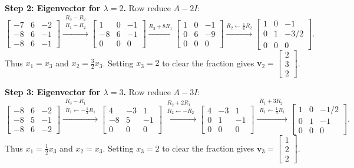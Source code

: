 \documentclass[11pt, letterpaper]{article}
\theoremstyle{definition}
\theoremstyle{remark}
\begin{document}
\textbf{Step 2: Eigenvector for $\lambda = 2$.} Row reduce $A - 2I$:
\[
\begin{bmatrix} -7 & 6 & -2 \\ -8 & 6 & -1 \\ -8 & 6 & -1 \end{bmatrix}
\xrightarrow{\substack{R_{3} - R_{2} \\ R_{1} - R_{2}}}
\begin{bmatrix} 1 & 0 & -1 \\ -8 & 6 & -1 \\ 0 & 0 & 0 \end{bmatrix}
\xrightarrow{R_{2} + 8R_{1}}
\begin{bmatrix} 1 & 0 & -1 \\ 0 & 6 & -9 \\ 0 & 0 & 0 \end{bmatrix}
\xrightarrow{R_{2} \leftarrow \frac{1}{6}R_{2}}
\begin{bmatrix} 1 & 0 & -1 \\ 0 & 1 & -3/2 \\ 0 & 0 & 0 \end{bmatrix}.
\]
Thus $x_{1} = x_{3}$ and $x_{2} = \frac{3}{2}x_{3}$. Setting $x_{3} = 2$ to clear the fraction gives $\mathbf{v}_{2} = \begin{bmatrix} 2 \\ 3 \\ 2 \end{bmatrix}$.

\textbf{Step 3: Eigenvector for $\lambda = 3$.} Row reduce $A - 3I$:
\[
\begin{bmatrix} -8 & 6 & -2 \\ -8 & 5 & -1 \\ -8 & 6 & -2 \end{bmatrix}
\xrightarrow{\substack{R_{3} - R_{1} \\ R_{1} \leftarrow -\frac{1}{2}R_{1}}}
\begin{bmatrix} 4 & -3 & 1 \\ -8 & 5 & -1 \\ 0 & 0 & 0 \end{bmatrix}
\xrightarrow{\substack{R_{2} + 2R_{1} \\ R_{2} \leftarrow -R_{2}}}
\begin{bmatrix} 4 & -3 & 1 \\ 0 & 1 & -1 \\ 0 & 0 & 0 \end{bmatrix}
\xrightarrow{\substack{R_{1} + 3R_{2} \\ R_{1} \leftarrow \frac{1}{4}R_{1}}}
\begin{bmatrix} 1 & 0 & -1/2 \\ 0 & 1 & -1 \\ 0 & 0 & 0 \end{bmatrix}.
\]
Thus $x_{1} = \frac{1}{2}x_{3}$ and $x_{2} = x_{3}$. Setting $x_{3} = 2$ to clear the fraction gives $\mathbf{v}_{3} = \begin{bmatrix} 1 \\ 2 \\ 2 \end{bmatrix}$.
\end{document}
